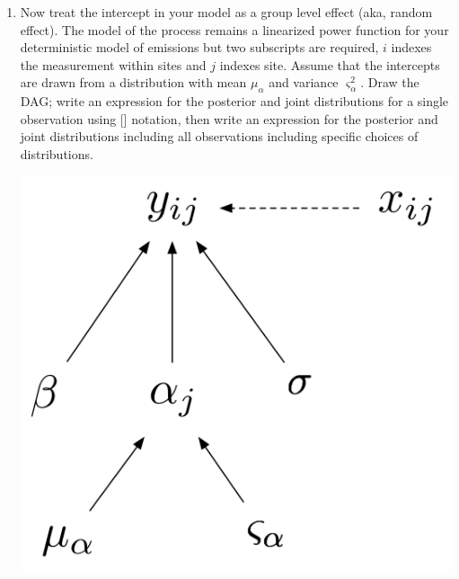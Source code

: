 \documentclass[12pt, oneside]{article}
\newif\ifanswers
\begin{document}
\begin{enumerate} [leftmargin=*]
\ifanswers
\begin{center}
\end{center}
\begin{align*}
[\alpha,\beta,\sigma \mid \mathbf{y}]&\propto\prod_{i=1}^{n}\text{normal}\big(\log(y_i)\mid g\big(\alpha,\beta,\log(x_i),\sigma^2\big)\\
&\times\text{normal}(\alpha\mid 0,10000)\text{normal}(\beta \mid 0,10000)\\
&\times\text{uniform}(\sigma\mid0,200)
\end{align*}
\fi

\ifanswers
What are assuming about the distribution of the untransformed $\mu_i$?  It is lognormal. Be sure you understand this.
\fi

\newpage

\item Now treat the intercept in your model as a group level effect (aka, random effect). The model of the process remains a linearized power function for your deterministic model of emissions but two subscripts are required, $i$ indexes the measurement within sites and $j$ indexes site. Assume that the intercepts are drawn from a distribution with mean $\mu_{\alpha}$ and variance $\varsigma_{\alpha}^2$. Draw the DAG; write an expression for the posterior and joint distributions for a single observation using [] notation, then write an expression for the posterior and joint distributions including all observations including specific choices of distributions. 

\ifanswers
\newpage
\begin{center}
\includegraphics[scale=.5]{DAG2.png}
\end{center}


\end{enumerate}
\end{document}
